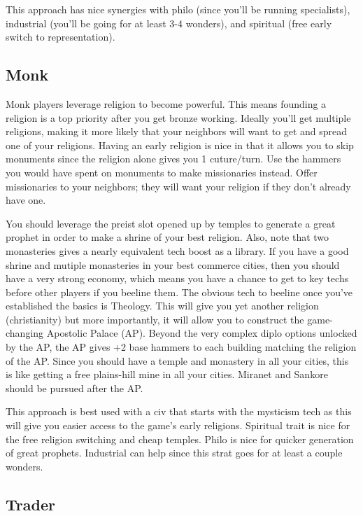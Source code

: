 \documentclass[10pt]{article}
\begin{document}
This approach has nice synergies with philo (since you'll be running
specialists), industrial (you'll be going for at least 3-4 wonders),
and spiritual (free early switch to representation).

\subsection*{Monk}

Monk players leverage religion to become powerful. This means founding
a religion is a top priority after you get bronze working. Ideally
you'll get multiple religions, making it more likely that your
neighbors will want to get and spread one of your religions. Having an
early religion is nice in that it allows you to skip monuments since
the religion alone gives you 1 cuture/turn. Use the hammers you would
have spent on monuments to make missionaries instead. Offer
missionaries to your neighbors; they will want your religion if they
don't already have one.

You should leverage the preist slot opened up
by temples to generate a great prophet in order to make a shrine of
your best religion. Also, note that two monasteries gives a nearly
equivalent tech boost as a library. If you have a good shrine and
mutiple monasteries in your best commerce cities, then you should have
a very strong economy, which means you have a chance to get to key
techs before other players if you beeline them. The obvious tech to
beeline once you've established the basics is Theology. This will give
you yet another religion (christianity) but more importantly, it will
allow you to construct the game-changing Apostolic Palace (AP). Beyond
the very complex diplo options unlocked by the AP, the AP gives +2
base hammers to each building matching the religion of the AP. Since
you should have a temple and monastery in all your cities, this is
like getting a free plains-hill mine in all your cities.  Miranet and
Sankore should be pursued after the AP.

This approach is best used with a civ that starts with the mysticism
tech as this will give you easier access to the game's early
religions. Spiritual trait is nice for the free religion switching and
cheap temples.  Philo is nice for quicker generation of great
prophets. Industrial can help since this strat goes for at least a
couple wonders.

\subsection*{Trader}
\end{document}
